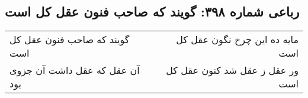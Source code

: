 \begin{center}
\section*{رباعی شماره ۳۹۸: گویند که صاحب فنون عقل کل است}
\label{sec:0398}
\begin{longtable}{l p{0.5cm} r}
گویند که صاحب فنون عقل کل است
&&
مایه ده این چرخ نگون عقل کل است
\\
آن عقل که عقل داشت آن جزوی بود
&&
ور عقل ز عقل شد کنون عقل کل است
\\
\end{longtable}
\end{center}
